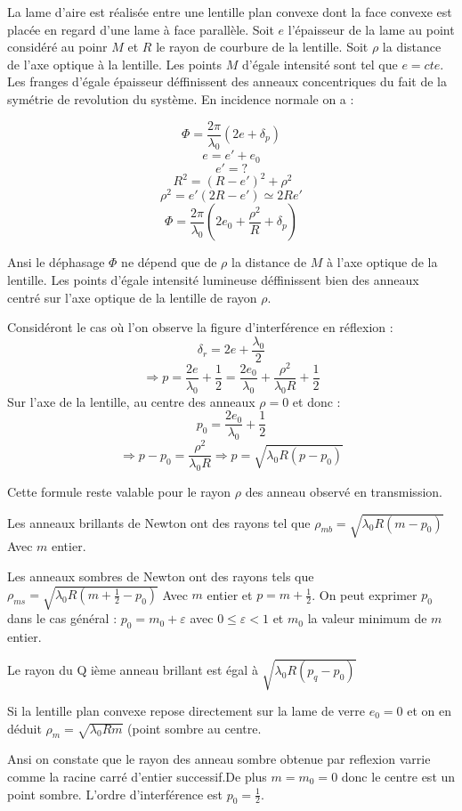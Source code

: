 \documentclass[a4paper,12pt]{article}
\theoremstyle{StyleTheo_will}
\theoremstyle{remark}
\begin{document}
La lame d'aire est réalisée entre une lentille plan convexe dont la face convexe est placée en regard d'une lame à face parallèle. 
Soit $e$ l'épaisseur de la lame au point considéré au poinr $M$ et $R$ le rayon de courbure de la lentille. Soit $\rho$ la distance de l'axe optique à la lentille. Les points $M$ d'égale intensité sont tel que $e = cte$. Les franges d'égale épaisseur déffinissent des anneaux concentriques du fait de la symétrie de revolution du système. En incidence normale on a : 

\[
\varPhi = \frac{2\pi}{\lambda_0}(2e+\delta_p)\]\[
e = e' + e_0\]\[
e'= ?\]\[\
R^2 =(R-e')^2 + \rho^2\]\[
\rho^2 = e'(2R - e') \simeq 2Re'\]\[
\varPhi = \frac{2\pi}{\lambda_0}\left(2e_0 + \frac{\rho^2}{R} + \delta_p\right)\]

Ansi le déphasage $\varPhi$ ne dépend que de $\rho$ la distance de $M$ à l'axe optique de la lentille. Les points d'égale intensité lumineuse déffinissent bien des anneaux centré sur l'axe optique de la lentille de rayon $\rho$.

Considéront le cas où l'on observe la figure d'interférence en réflexion : 
\[\delta_r = 2e + \frac{\lambda_0}{2}\]
\[\Rightarrow p = \frac{2e}{\lambda_0} + \frac{1}{2} = \frac{2e_0}{\lambda_0} + \frac{\rho^2}{\lambda_0R} + \frac{1}{2}\]
Sur l'axe de la lentille, au centre des anneaux $\rho = 0$ et donc :\[p_0= \frac{2e_0}{\lambda_0} + \frac{1}{2}\] \[\Rightarrow p - p_0 = \frac{\rho^2}{\lambda_0R} \Rightarrow p = \sqrt{\lambda_0 R (p-p_0)}\]

Cette formule reste valable pour le rayon $\rho$ des anneau observé en transmission.

Les anneaux brillants de Newton ont des rayons tel que $\rho_{mb} = \sqrt{\lambda_0 R(m-p_0)} $ Avec $m$ entier.

Les anneaux sombres de Newton ont des rayons tels que $\rho_{ms} = \sqrt{\lambda_0 R(m+ \frac{1}{2}-p_0)} $ Avec $m$ entier et $p = m +\frac{1}{2}$. On peut exprimer $p_0$ dans le cas général : $p_0 = m_0 + \varepsilon$ avec $0\leqslant\varepsilon< 1$ et $m_0$ la valeur minimum de $m$ entier.

Le rayon du Q ième anneau brillant est égal à $\sqrt{\lambda_0  R (p_q-p_0)}$

Si la lentille plan convexe repose directement sur la lame de verre $e_0 =0$ et on en déduit $\rho_m = \sqrt{\lambda_0 R m} $ (point sombre au centre.

Ansi on constate que le rayon des anneau sombre obtenue par reflexion varrie comme la racine carré d'entier successif.De plus $m = m_0 = 0$ donc le centre est un point sombre. L'ordre d'interférence est $p_0 = \frac{1}{2}$.
\end{document}
